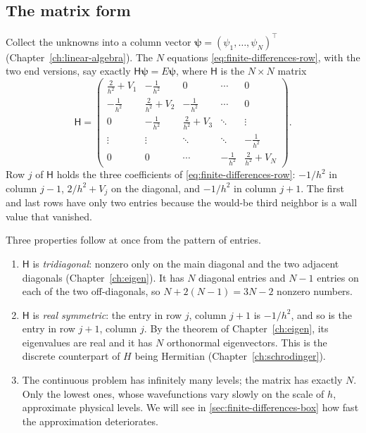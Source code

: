 \subsection{The matrix form}

Collect the unknowns into a column vector $\bm\psi=(\psi_1,\dots,\psi_N)^\top$ (Chapter~\ref{ch:linear-algebra}). The $N$ equations \eqref{eq:finite-differences-row}, with the two end versions, say exactly $\mathsf H\bm\psi=E\bm\psi$, where $\mathsf H$ is the $N\times N$ matrix
\begin{equation}
\mathsf H=\begin{pmatrix}
\frac{2}{h^2}+V_1 & -\frac{1}{h^2} & 0 & \cdots & 0\\[2pt]
-\frac{1}{h^2} & \frac{2}{h^2}+V_2 & -\frac{1}{h^2} & \cdots & 0\\[2pt]
0 & -\frac{1}{h^2} & \frac{2}{h^2}+V_3 & \ddots & \vdots\\
\vdots & \vdots & \ddots & \ddots & -\frac{1}{h^2}\\[2pt]
0 & 0 & \cdots & -\frac{1}{h^2} & \frac{2}{h^2}+V_N
\end{pmatrix}.
\label{eq:finite-differences-matrix}
\end{equation}
Row $j$ of $\mathsf H$ holds the three coefficients of \eqref{eq:finite-differences-row}: $-1/h^2$ in column $j-1$, $2/h^2+V_j$ on the diagonal, and $-1/h^2$ in column $j+1$. The first and last rows have only two entries because the would-be third neighbor is a wall value that vanished.

Three properties follow at once from the pattern of entries.
\begin{enumerate}
\item $\mathsf H$ is \emph{tridiagonal}: nonzero only on the main diagonal and the two adjacent diagonals (Chapter~\ref{ch:eigen}). It has $N$ diagonal entries and $N-1$ entries on each of the two off-diagonals, so $N+2(N-1)=3N-2$ nonzero numbers.
\item $\mathsf H$ is \emph{real symmetric}: the entry in row $j$, column $j+1$ is $-1/h^2$, and so is the entry in row $j+1$, column $j$. By the theorem of Chapter~\ref{ch:eigen}, its eigenvalues are real and it has $N$ orthonormal eigenvectors. This is the discrete counterpart of $H$ being Hermitian (Chapter~\ref{ch:schrodinger}).
\item The continuous problem has infinitely many levels; the matrix has exactly $N$. Only the lowest ones, whose wavefunctions vary slowly on the scale of $h$, approximate physical levels. We will see in \cref{sec:finite-differences-box} how fast the approximation deteriorates.
\end{enumerate}

